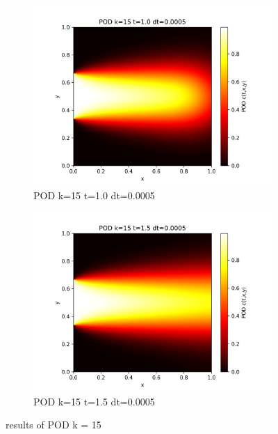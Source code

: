 \documentclass[11pt,a4 paper,one side]{article}
\begin{document}
\begin{figure}[htbp]
    \vspace{0.5cm}  %
    
    \begin{subfigure}{0.45\textwidth}
        \includegraphics[width=\textwidth]{POD k=15 t=1.0 dt=0.0005.png}
        \caption{POD k=15 t=1.0 dt=0.0005}
        \label{POD k=15 t=1.0 dt=0.0005}
    \end{subfigure}
    \hfill
    \begin{subfigure}{0.45\textwidth}
        \includegraphics[width=\textwidth]{POD k=15 t=1.5 dt=0.0005.png}
        \caption{POD k=15 t=1.5 dt=0.0005}
        \label{POD k=15 t=1.5 dt=0.0005}
    \end{subfigure}
    
    \caption{results of POD k = 15}
    \label{results of POD k = 15}
\end{figure}
\end{document}
